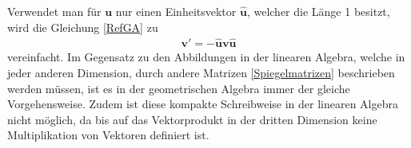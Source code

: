 Verwendet man für $\mathbf{u}$ nur einen Einheitsvektor $\mathbf{\hat{u}}$, welcher die Länge 1 besitzt, wird die Gleichung \eqref{RefGA} zu
\begin{align}
	\mathbf{v'} = -\mathbf{\hat{u}v\hat{u}}
\end{align}
vereinfacht. Im Gegensatz zu den Abbildungen in der linearen Algebra, welche in jeder anderen Dimension, durch andere Matrizen \eqref{Spiegelmatrizen} beschrieben werden müssen, ist es in der geometrischen Algebra immer der gleiche Vorgehensweise. Zudem ist diese kompakte Schreibweise in der linearen Algebra nicht möglich, da bis auf das Vektorprodukt in der dritten Dimension keine Multiplikation von Vektoren definiert ist. 
